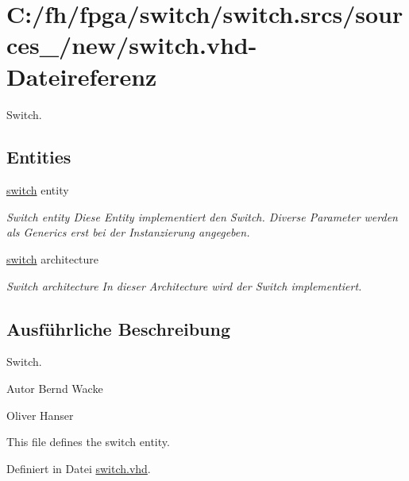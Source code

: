 \hypertarget{switch_8vhd}{}\section{C\+:/fh/fpga/switch/switch.srcs/sources\+\_/new/switch.vhd-\/\+Dateireferenz}
\label{switch_8vhd}


Switch.  


\subsection*{Entities}
\begin{DoxyCompactItemize}
\item 
\mbox{\hyperlink{classswitch}{switch}} entity
\begin{DoxyCompactList}\small\item\em Switch entity Diese Entity implementiert den Switch. Diverse Parameter werden als Generics erst bei der Instanzierung angegeben. \end{DoxyCompactList}\item 
\mbox{\hyperlink{classswitch_1_1switch}{switch}} architecture
\begin{DoxyCompactList}\small\item\em Switch architecture In dieser Architecture wird der Switch implementiert. \end{DoxyCompactList}\end{DoxyCompactItemize}


\subsection{Ausführliche Beschreibung}
Switch. 

\begin{DoxyAuthor}{Autor}
Bernd Wacke 

Oliver Hanser
\end{DoxyAuthor}
This file defines the switch entity. 

Definiert in Datei \mbox{\hyperlink{switch_8vhd_source}{switch.\+vhd}}.

